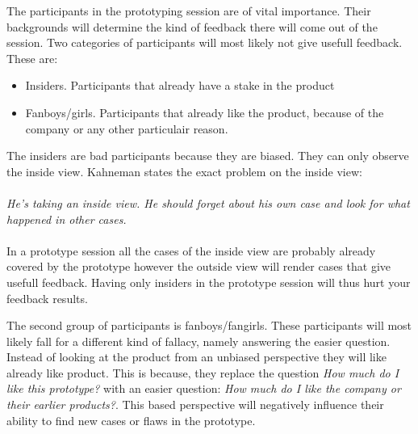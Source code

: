 \documentclass[Main.tex]{subfiles}
\begin{document}
The participants in the prototyping session are of vital importance. Their backgrounds will determine the kind of feedback there will come out of the session. Two categories of participants will most likely not give usefull feedback. These are:

\begin{itemize}
\item Insiders. Participants that already have a stake in the product
\item Fanboys/girls. Participants that already like the product, because of the company or any other particulair reason.
\end{itemize}
The insiders are bad participants because they are biased. They can only observe the inside view. Kahneman states the exact problem on the inside view: \\ \\
\emph{He's taking an inside view. He should forget about his own case and look for what happened in other cases.} \\ \\
In a prototype session all the cases of the inside view are probably already covered by the prototype however the outside view will render cases that give usefull feedback. Having only insiders in the prototype session will thus hurt your feedback results.

The second group of participants is fanboys/fangirls. These participants will most likely fall for a different kind of fallacy, namely answering the easier question. Instead of looking at the product from an unbiased perspective they will like already like product. This is because, they replace the question \emph{How much do I like this prototype?} with an easier question: \emph{How much do I like the company or their earlier products?}. This based perspective will negatively influence their ability to find new cases or flaws in the prototype.
\end{document}

